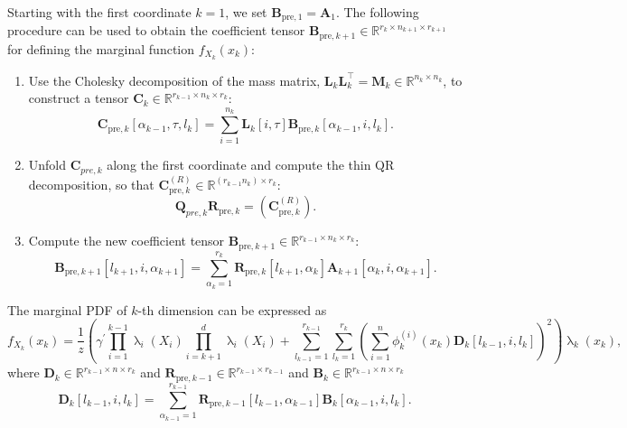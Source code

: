 \begin{prop}
	\label{prob:ForMarg}
	Starting with the first coordinate $k = 1$, we set $\bm{B}_{\text{pre},1} = \bm{A}_1$. The following procedure can be used to obtain the coefficient tensor $\bm{B}_{\text{pre},k+1} \in \mathbb{R}^{r_{k} \times n_{k+1} \times r_{k+1}}$ for defining the marginal function $f_{X_k}(x_k)$:
	\begin{enumerate}
		\item Use the Cholesky decomposition of the mass matrix, $\bm{L}_k \bm{L}_k^\top = \bm{M}_k \in \mathbb{R}^{n_k \times n_k}$, to construct a tensor $\bm{C}_k \in \mathbb{R}^{r_{k-1} \times n_k \times r_k}$:
		\begin{equation}
			\bm{C}_{\text{pre},k}[\alpha_{k-1}, \tau, l_k] = \sum_{i=1}^{n_k} \bm{L}_k[i, \tau] \bm{B}_{\text{pre},k}[\alpha_{k-1}, i, l_k] .
		\end{equation}
		\item Unfold $\bm{C}_{pre,k}$ along the first coordinate and compute the thin QR decomposition, so that $\bm{C}_{\text{pre},k}^{(R)} \in \mathbb{R}^{(r_{k-1} n_k ) \times r_k}$:
		\begin{equation}
			\bm{Q}_{pre,k}\bm{R}_{\text{pre},k} = {(\bm{C}_{\text{pre},k}^{(R)})}.
		\end{equation}
		\item Compute the new coefficient tensor $\bm{B}_{\text{pre}, k+1} \in \mathbb{R}^{r_{k-1} \times n_k \times r_k} $:
		\begin{equation}
			\bm{B}_{\text{pre}, k+1}[l_{k+1}, i, \alpha_{k+1}] = \sum_{\alpha_{k}=1}^{r_{k}} \bm{R}_{\text{pre},k}[l_{k+1}, \alpha_{k}] \bm{A}_{k+1}[\alpha_{k}, i, \alpha_{k+1}] .
		\end{equation}
	\end{enumerate}
\end{prop}

The marginal PDF of $k$-th dimension can be expressed as
\begin{equation}
	f_{X_k}(x_k) = \frac{1}{z} \left(\gamma^{\prime} \prod_{i=1}^{k-1} \uplambda_i(X_i) \prod_{i=k+1}^{d} \uplambda_i(X_i) + \sum_{l_{k-1}=1}^{r_{k-1}} \sum_{l_k=1}^{r_k} \left(\sum_{i=1}^{n} \phi^{(i)}_k(x_k) \bm{D}_k[l_{k-1},i, l_k] \right)^2 \right) \uplambda_k(x_k),
\end{equation}
where $\bm{D}_k \in \mathbb{R}^{r_{k-1} \times n \times r_k}$ and $\bm{R}_{\text{pre},k-1}\in \mathbb{R}^{r_{k-1} \times r_{k-1}}$ and $\bm{B}_k \in \mathbb{R}^{r_{k-1} \times n \times r_k}$
\begin{equation}
	\bm{D}_k[l_{k-1},i,l_k] = \sum_{\alpha_{k-1}=1}^{r_{k-1}}  \bm{R}_{\text{pre},k-1}[l_{k-1}, \alpha_{k-1}] \bm{B}_k[\alpha_{k-1}, i, l_k].
\end{equation}

